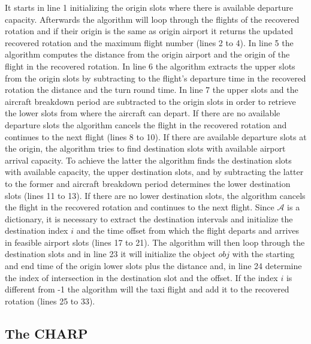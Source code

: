 It starts in line 1  initializing the origin slots where there is available departure capacity. Afterwards the algorithm will loop through the flights of the recovered rotation  and if their origin is the same as origin airport it returns the updated recovered rotation and the maximum flight number (lines 2 to 4). In line 5 the algorithm computes the distance from the origin airport and the origin of the flight in the recovered rotation. In line 6 the algorithm extracts the upper slots from the origin slots by subtracting to the flight's departure time in the recovered rotation the distance and the turn round time. In line 7 the upper slots and the aircraft breakdown period are subtracted to the origin slots in order to retrieve the lower slots from where the aircraft can depart. If there are no available departure slots the algorithm cancels the flight in the recovered rotation and continues to the next flight (lines 8 to 10). If there are available departure slots at the origin, the algorithm tries to find destination slots with available airport arrival capacity. To achieve the latter the algorithm finds the destination slots with available capacity, the upper destination slots, and by subtracting the latter to the former and aircraft breakdown period determines the lower destination slots (lines 11 to 13). If there are no lower destination slots, the algorithm cancels the flight in the recovered rotation and continues to the next flight. Since $\mathcal{A}$ is a dictionary, it is necessary to extract the destination intervals and initialize the destination index $i$ and the time offset from which the flight departs and arrives in feasible airport slots (lines 17 to 21). The algorithm will then loop through the destination slots and in line 23 it will initialize the object $obj$ with the starting and end time of the origin lower slots plus the distance and, in line 24 determine the index of intersection in the destination slot and the offset. If the index $i$ is different from -1 the algorithm will the taxi flight and add it to the recovered rotation (lines 25 to 33).\\ 

\subsection{The CHARP} \label{sec:charp}

